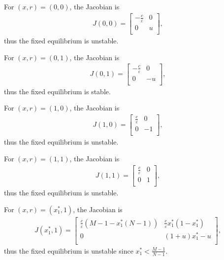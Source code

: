 \documentclass[9pt]{elife}
\begin{document}
\begin{appendixbox}
For $(x, r) = (0, 0)$, the Jacobian is
\begin{eqnarray*}
J(0, 0) =
  \left[ {\begin{array}{cc}
    -\frac{c}{\varepsilon} & 0 \\
    0 & u \\
  \end{array} } \right],
\end{eqnarray*}
thus the fixed equilibrium is unstable.

For $(x, r) = (0, 1)$, the Jacobian is
\begin{eqnarray*}
J(0, 1) =
  \left[ {\begin{array}{cc}
    -\frac{c}{\varepsilon} & 0 \\
    0 & -u \\
  \end{array} } \right],
\end{eqnarray*}
thus the fixed equilibrium is stable.

For $(x, r) = (1, 0)$, the Jacobian is
\begin{eqnarray*}
J(1, 0) =
  \left[ {\begin{array}{cc}
    \frac{c}{\varepsilon} & 0 \\
    0 & -1 \\
  \end{array} } \right],
\end{eqnarray*}
thus the fixed equilibrium is unstable.

For $(x, r) = (1, 1)$, the Jacobian is
\begin{eqnarray*}
J(1, 1) =
  \left[ {\begin{array}{cc}
    \frac{c}{\varepsilon} & 0 \\
    0 & 1 \\
  \end{array} } \right],
\end{eqnarray*}
thus the fixed equilibrium is unstable.

For $(x, r) = (x_{1}^{*}, 1)$, the Jacobian is
\begin{eqnarray*}
J(x_{1}^{*}, 1) =
  \left[ {\begin{array}{cc}
    \frac{c}{\varepsilon}(M-1-x_{1}^{*}(N-1)) & \frac{c}{\varepsilon}x_{1}^{*}(1-x_{1}^{*}) \\
    0 & (1+u)x_{1}^{*}-u \\
  \end{array} } \right],
\end{eqnarray*}
thus the fixed equilibrium is unstable since $x_{1}^{*}<\frac{M-1}{N-1}$.


\end{appendixbox}
\end{document}
